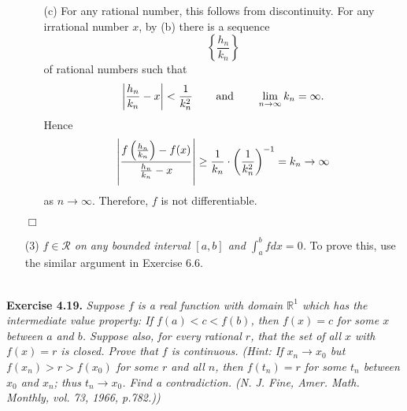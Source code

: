 \documentclass{article}
\begin{document}
\begin{enumerate}
\begin{enumerate}
  \item[(c)]
  For any rational number, this follows from discontinuity.
  For any irrational number $x$,
  by (b) there is a sequence
  \[
    \left\{ \frac{h_n}{k_n} \right\}
  \]
  of rational numbers such that
  \[
    \abs{ \frac{h_n}{k_n} - x } < \frac{1}{k_n^2}
    \:\:\:\:\:\:\:\:\text{ and }\:\:\:\:\:\:\:\:
    \lim_{n \to \infty} k_n = \infty.
  \]
  Hence
  \[
    \abs{ \frac{f\left( \frac{h_n}{k_n} \right) - f(x)}{\frac{h_n}{k_n} - x} }
    \geq
    \frac{1}{k_n} \cdot \left( \frac{1}{k_n^2} \right)^{-1}
    = k_n
    \to \infty
  \]
  as $n \to \infty$.
  Therefore, $f$ is not differentiable.
  \end{enumerate}
  $\Box$

\item[(3)]
\emph{$f \in \mathscr{R}$ on any bounded interval $[a,b]$ and $\int_{a}^{b} f dx = 0$.}
To prove this, use the similar argument in Exercise 6.6. \\\\
\end{enumerate}






\textbf{Exercise 4.19.}
\emph{Suppose $f$ is a real function with domain $\mathbb{R}^1$
which has the intermediate value property:
If $f(a) < c < f(b)$, then $f(x)=c$ for some $x$ between $a$ and $b$.
Suppose also, for every rational $r$,
that the set of all $x$ with $f(x)=r$ is closed.
Prove that $f$ is continuous.
(Hint: If $x_n \to x_0$ but $f(x_n) > r > f(x_0)$ for some $r$ and all $n$,
then $f(t_n) = r$ for some $t_n$ between $x_0$ and $x_n$;
thus $t_n \to x_0$.
Find a contradiction.
(N. J. Fine, Amer. Math. Monthly, vol. 73, 1966, p.782.))} \\
\end{document}
